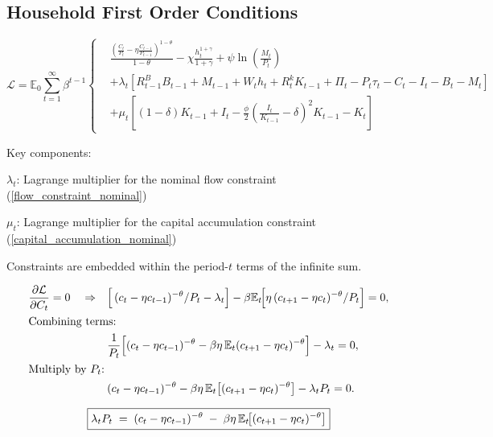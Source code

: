 \documentclass[11pt,preprint]{elsarticle}
\numberwithin{equation}{section}
\numberwithin{figure}{section}
\numberwithin{table}{section}
\begin{document}
\subsection{\texorpdfstring{Household First Order Conditions
\label{household_FOC}}{Household First Order Conditions }}\label{household-first-order-conditions}

\begin{equation}
\mathcal{L} = \mathbb{E}_0 \sum_{t=1}^{\infty} \beta^{t-1} 
\left\{
\begin{aligned}
& \frac{\left( \frac{C_t}{P_t} - \eta \frac{C_{t-1}}{P_{t-1}} \right)^{1-\theta}}{1-\theta} 
- \chi \frac{h_t^{1+\gamma}}{1+\gamma} 
+ \psi \ln \left( \frac{M_t}{P_t} \right) \\
& + \lambda_t \left[ R^B_{t-1} B_{t-1} + M_{t-1} + W_t h_t + R^k_t K_{t-1} + \Pi_t - P_t \tau_t - C_t - I_t - B_t - M_t \right] \\
& + \mu_t \left[ (1 - \delta) K_{t-1} + I_t - \frac{\phi}{2} \left( \frac{I_t}{K_{t-1}} - \delta \right)^2 K_{t-1} - K_t \right]
\end{aligned}
\right.
\end{equation}

Key components:

\(\lambda_t\): Lagrange multiplier for the nominal flow constraint
(\ref{flow_constraint_nominal})

\(\mu_t\): Lagrange multiplier for the capital accumulation constraint
(\ref{capital_accumulation_nominal})

Constraints are embedded within the period-\(t\) terms of the infinite
sum.

\begin{align*}
  \frac{\partial \mathcal{L}}{\partial C_t} = 0
  \quad\Rightarrow\quad
  &\Bigl[\,(c_t - \eta c_{t-1})^{-\theta}/P_t - \lambda_t\Bigr]
    - \beta \mathbb{E}_t\!\Bigl[\eta\,(c_{t+1}-\eta c_t)^{-\theta}/P_t\Bigr]
    = 0,\\
  \intertext{Combining terms:}
  &\frac{1}{P_t}\Bigl[
     (c_t - \eta c_{t-1})^{-\theta}
     - \beta \eta\,\mathbb{E}_t (c_{t+1} - \eta c_t)^{-\theta}
   \Bigr]
   - \lambda_t
   = 0,\\
  \intertext{Multiply by \(P_t\):}
  &(c_t - \eta c_{t-1})^{-\theta}
   - \beta \eta\,\mathbb{E}_t\bigl[(c_{t+1} - \eta c_t)^{-\theta}\bigr]
   - \lambda_t P_t
   = 0.
\end{align*}

\begin{equation}\label{foc_C}
  \boxed{%
    \lambda_t P_t
    \;=\;
    (c_t - \eta c_{t-1})^{-\theta}
    \;-\;
    \beta \eta\,\mathbb{E}_t\!\bigl[(c_{t+1} - \eta c_t)^{-\theta}\bigr]
  }
\end{equation}
\end{document}
